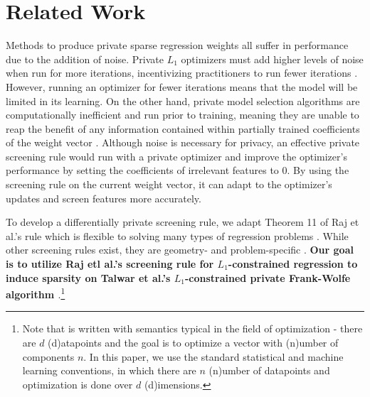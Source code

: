 \section{Related Work}
Methods to produce private sparse regression weights all suffer in performance due to the addition of noise. Private $L_1$ optimizers must add higher levels of noise when run for more iterations, incentivizing practitioners to run fewer iterations \cite{talwar2015nearly,wang2020differential}. However, running an optimizer for fewer iterations means that the model will be limited in its learning. On the other hand, private model selection algorithms are computationally inefficient and run prior to training, meaning they are unable to reap the benefit of any information contained within partially trained coefficients of the weight vector \cite{lei2018differentially,thakurta2013differentially}. Although noise is necessary for privacy, an effective private screening rule would run with a private optimizer and improve the optimizer's performance by setting the coefficients of irrelevant features to 0. By using the screening rule on the current weight vector, it can adapt to the optimizer's updates and screen features more accurately. 

%

To develop a differentially private screening rule, we adapt Theorem 11 of Raj et al.'s rule which is flexible to solving many types of regression problems \cite{raj2016screening}. While other screening rules exist, they are geometry- and problem-specific \cite{ghaoui2010safe,wang2014safe,wang2013lasso}. \textbf{Our goal is to utilize Raj etl al.'s screening rule for $L_1$-constrained regression to induce sparsity on Talwar et al.'s $L_1$-constrained private Frank-Wolfe algorithm \cite{raj2016screening,talwar2015nearly}}.\footnote{Note that \cite{raj2016screening} is written with semantics typical in the field of optimization - there are $d$ (d)atapoints and the goal is to optimize a vector with (n)umber of components $n$. In this paper, we use the standard statistical and machine learning conventions, in which there are $n$ (n)umber of datapoints and optimization is done over $d$ (d)imensions.}

